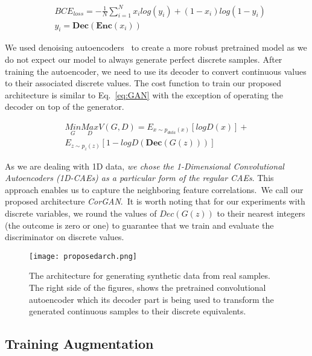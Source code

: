 \documentclass[letterpaper]{article} \usepackage{aaai20}  \usepackage{times}  \usepackage{helvet} \usepackage{courier}  \usepackage[hyphens]{url}  \usepackage{graphicx} \urlstyle{rm} \def\UrlFont{\rm}  \usepackage{graphicx}  \frenchspacing  \setlength{\pdfpagewidth}{8.5in}  \setlength{\pdfpageheight}{11in}
\begin{document}
\begin{align}\label{eq:binarycrossentropy}
& BCE_{loss}= -\frac{1}{N}\sum_{i=1}^{N}x_ilog(y_i)+(1-x_i)log(1-y_i) \\ 
 & y_i =\boldsymbol{Dec}(\boldsymbol{Enc}(x_i))
\end{align}

We used denoising autoencoders~\cite{vincent2010stacked} to create a more robust pretrained model as we do not expect our model to always generate perfect discrete samples.
After training the autoencoder, we need to use its decoder to convert continuous values to their associated discrete values.
The cost function to train our proposed architecture is similar to Eq.~\ref{eq:GAN} with the exception of operating the decoder on top of the generator.

\begin{equation}\label{eq:GANproposed}
\begin{split}
\underset{G}{Min}\underset{D}{Max}V(G,D) = E_{x\sim p_{data}(x)}[logD(x)] + \\ E_{z\sim p_{z}(z)}[1-logD(\boldsymbol{Dec}(G(z)))]
\end{split}
\end{equation}

As we are dealing with 1D data,
\textit{we chose the 1-Dimensional
Convolutional Autoencoders (1D-CAEs) as a particular form of the regular CAEs}.
This approach enables us to capture the neighboring feature correlations.~We call our proposed architecture \textit{CorGAN}.~It is worth noting that for our experiments with discrete variables, we round the values of $Dec(G(z))$ to their nearest integers (the outcome is zero or one) to guarantee that we train and evaluate the discriminator on discrete values.


\begin{figure}
\centering
    \texttt{[image: proposedarch.png]}
    \caption[The proposed architecture for synthetic data generation]{The architecture for generating synthetic data from real samples. The right side of the figures, shows the pretrained convolutional autoencoder which its decoder part is being used to transform the generated continuous samples to their discrete equivalents.} \label{fig:proposedarch}
\end{figure}


\subsection{Training Augmentation}\label{sec:Methodsub:TrainingAugmentation}
\end{document}
